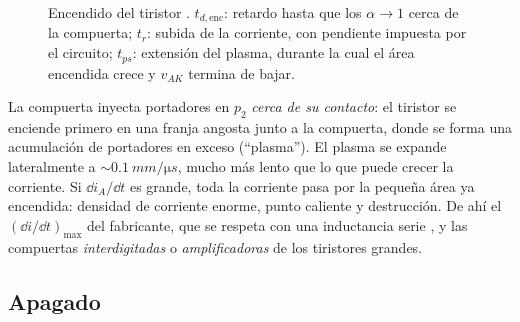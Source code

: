 \begin{figure}[H]
\centering
{}
\caption{Encendido del tiristor . $t_{d,\mathrm{enc}}$: retardo hasta que los $\alpha\to1$
cerca de la compuerta; $t_r$: subida de la corriente, con pendiente impuesta por el circuito;
$t_{ps}$: extensión del plasma, durante la cual el área encendida crece y $v_{AK}$ termina de bajar.}
\label{fig:tiristor-encendido}
\end{figure}

\begin{intuicion}
La compuerta inyecta portadores en $p_2$ \emph{cerca de su contacto}: el tiristor se enciende
primero en una franja angosta junto a la compuerta, donde se forma una acumulación de portadores en
exceso (``plasma''). El plasma se expande lateralmente a $\sim\SI{0.1}{mm/\micro s}$, mucho más lento
que lo que puede crecer la corriente. Si $\dd i_A/\dd t$ es grande, toda la corriente pasa por la
pequeña área ya encendida: densidad de corriente enorme, punto caliente y destrucción. De ahí el
$(\dd i/\dd t)_{\max}$ del fabricante, que se respeta con una inductancia serie , y las
compuertas \emph{interdigitadas} o \emph{amplificadoras} de los tiristores grandes.
\end{intuicion}

\subsection{Apagado}

